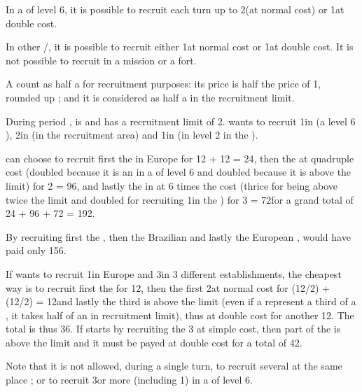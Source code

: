  In a \COL of level 6, it is possible to recruit each
turn up to 2\LD (at normal cost) or 1\ARMY\Facemoins at double cost.

 In other \COL/\TP, it is possible to recruit
either 1\LDE at normal cost or 1\LD at double cost.
\bparag It is not possible to recruit in a mission or a fort.

\aparag[Exploration.] A \LDE count as half a \LD for recruitment purposes: its
price is half the price of 1\LD, rounded up ; and it is considered as half a
\LD in the recruitment limit.

\begin{exemple}
  During period , \POR is \TREN and has a recruitment limit of
  2\LD. \POR wants to recruit 1\ARMY\Facemoins in  (a level
  6 \COL), 2\LD in \provinceTejo (in the recruitment area) and 1\LD in
  \continentBrazil (in level 2 \COL in the \ROTW).

  \POR can choose to recruit first the \LD in Europe for 12 + 12 = 24\ducats,
  then the \ARMY\Facemoins at quadruple cost (doubled because it is an
  \ARMY\Facemoins in a \COL of level 6 and doubled because it is above the
  limit) for 2   = 96\ducats, and lastly the
  \LD in \continentBrazil at 6 times the cost (thrice for being above twice
  the limit and doubled for recruiting 1\LD in the \ROTW) for 3   = 72\ducats for a grand total of 24 + 96 + 72 =
  192\ducats.

  By recruiting first the \ARMY\Facemoins, then the Brazilian \LD and lastly
  the European \LD, \POR would have paid only 156\ducats.

  If \POR wants to recruit 1\LD in Europe and 3\LDE in 3 different \ROTW
  establishments, the cheapest way is to recruit first the \LD for 12\ducats,
  then the first 2\LDE at normal cost for (12/2) + (12/2) = 12\ducats and
  lastly the third \LDE is above the limit (even if a \LDE represent a third
  of a \LD, it takes half of an \LD in recruitment limit), thus at double cost
  for another 12\ducats. The total is thus 36\ducats. If \POR starts by
  recruiting the 3 \LDE at simple cost, then part of the \LD is above the
  limit and it must be payed at double cost for a total of 42\ducats.

  Note that it is not allowed, during a single turn, to recruit several \LDE
  at the same place ; or to recruit 3\LD or more (including 1\ARMY\Faceplus)
  in a \COL of level 6.
\end{exemple}



